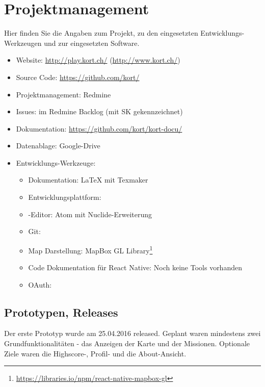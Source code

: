 \chapter{Projektmanagement}
\label{pm-projektmanagement}
Hier finden Sie die Angaben zum Projekt, zu den eingesetzten Entwicklungs-Werkzeugen und zur eingesetzten Software.

\begin{itemize}
    \item Website: \url{http://play.kort.ch/} (\url{http://www.kort.ch/})
    \item Source Code: \url{https://github.com/kort/}
    \item Projektmanagement: Redmine
    \item Issues: im Redmine Backlog (mit SK gekennzeichnet)
    \item Dokumentation: \url{https://github.com/kort/kort-docu/}
    \item Datenablage: Google-Drive
    \item Entwicklungs-Werkzeuge:
    \begin{itemize}
    		\item Dokumentation: \LaTeX{} mit Texmaker
    		\item Entwicklungsplattform: 
    		\item {}-Editor: Atom mit Nuclide-Erweiterung
    		\item Git: 
    		\item Map Darstellung: MapBox GL Library\footnote{\url{https://libraries.io/npm/react-native-mapbox-gl}}
    		\item Code Dokumentation für React Native: Noch keine Tools vorhanden
    		\item OAuth: 
    \end{itemize}
\end{itemize}


\section{Prototypen, Releases}
Der erste Prototyp wurde am 25.04.2016 released. 
Geplant waren mindestens zwei Grundfunktionalitäten - das Anzeigen der Karte und der Missionen. 
Optionale Ziele waren die Highscore-, Profil- und die About-Ansicht.


